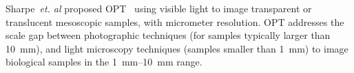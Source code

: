 \documentclass[times, twoside, watermark]{zHenriquesLab-StyleBioRxiv}
\begin{document}
%



Sharpe~\emph{et. al} proposed \gls{OPT}~\cite{sharpeOpticalProjectionTomography2002}
using visible light to image transparent or translucent mesoscopic samples, with micrometer resolution.
\gls{OPT} addresses the scale gap between photographic techniques (for samples typically larger than \SI{10}{\milli\meter}), and light microscopy techniques (samples smaller than \SI{1}{\milli\meter}) to image biological samples in the \SIrange{1}{10}{\milli\meter} range.
\end{document}
